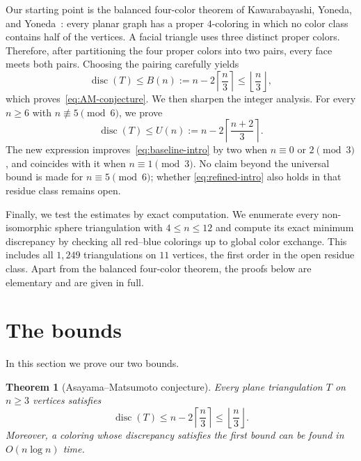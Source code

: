 \documentclass[11pt]{amsart}
\newtheorem{theorem}{Theorem}[section]
\newcommand{\disc}{\operatorname{disc}}
\newcommand{\ceil}[1]{\left\lceil #1\right\rceil}
\newcommand{\floor}[1]{\left\lfloor #1\right\rfloor}
\begin{document}
Our starting point is the balanced four-color theorem of Kawarabayashi,
Yoneda, and Yoneda~\cite{KawarabayashiEtAl2026}: every planar graph has a
proper $4$-coloring in which no color class contains half of the vertices.
A facial triangle uses three distinct proper colors.  Therefore, after
partitioning the four proper colors into two pairs, every face meets both
pairs.  Choosing the pairing carefully yields
\begin{equation}\label{eq:baseline-intro}
  \disc(T)\le B(n):=n-2\ceil{\frac n3}
  \le\floor{\frac n3},
\end{equation}
which proves~\eqref{eq:AM-conjecture}. We then sharpen the integer analysis.  For every $n\ge6$ with
$n\not\equiv5\pmod6$, we prove
\begin{equation}\label{eq:refined-intro}
  \disc(T)\le U(n):=n-2\ceil{\frac{n+2}{3}}.
\end{equation}
The new expression improves~\eqref{eq:baseline-intro} by two when
$n\equiv0$ or $2\pmod3$, and coincides with it when $n\equiv1\pmod3$.
No claim beyond the universal bound is made for $n\equiv5\pmod6$; whether
\eqref{eq:refined-intro} also holds in that residue class remains open.

Finally, we test the estimates by exact computation.  We enumerate every
non-isomorphic sphere triangulation with $4\le n\le12$ and compute its exact
minimum discrepancy by checking all red--blue colorings up to global color
exchange.  This includes all $1{,}249$ triangulations on $11$ vertices, the
first order in the open residue class.  Apart from the balanced four-color
theorem, the proofs below are elementary and are given in full.

\section{The bounds}\label{sec:universal}
In this section we prove our two bounds.


\begin{theorem}[Asayama--Matsumoto conjecture]\label{thm:universal}
Every plane triangulation $T$ on $n\ge3$ vertices satisfies
\begin{equation}\label{eq:universal}
  \disc(T)\le n-2\ceil{\frac n3}\le\floor{\frac n3}.
\end{equation}
Moreover, a coloring whose discrepancy satisfies the first bound can be found in
$O(n\log n)$ time.
\end{theorem}
\end{document}
